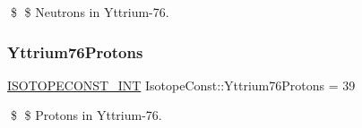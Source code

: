 \$ \$ Neutrons in Yttrium-\/76. \mbox{\label{group___isotope_const-_yttrium-_y76_ga3faf98253b6a4555d810402df64adfed}} 
\subsubsection{\texorpdfstring{Yttrium76\+Protons}{Yttrium76Protons}}
{\footnotesize\ttfamily \mbox{\hyperlink{group___isotope_const-_macros_ga5f18360b3e99483a35c32d789e62621c}{I\+S\+O\+T\+O\+P\+E\+C\+O\+N\+S\+T\+\_\+\+I\+NT}} Isotope\+Const\+::\+Yttrium76\+Protons = 39}

\$ \$ Protons in Yttrium-\/76. 